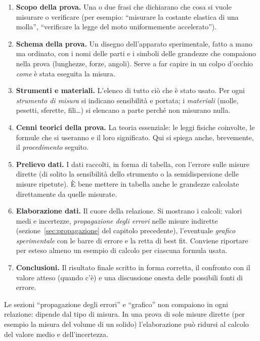 \begin{enumerate}[label=\arabic*.]
    \item \textbf{Scopo della prova.} Una o due frasi che dichiarano che cosa si vuole misurare o verificare (per esempio: ``misurare la costante elastica di una molla'', ``verificare la legge del moto uniformemente accelerato'').
    \item \textbf{Schema della prova.} Un disegno dell'apparato sperimentale, fatto a mano ma ordinato, con i nomi delle parti e i simboli delle grandezze che compaiono nella prova (lunghezze, forze, angoli). Serve a far capire in un colpo d'occhio \emph{come} è stata eseguita la misura.
    \item \textbf{Strumenti e materiali.} L'elenco di tutto ciò che è stato usato. Per ogni \emph{strumento di misura} si indicano sensibilità e portata; i \emph{materiali} (molle, pesetti, sferette, fili\dots) si elencano a parte perché non misurano nulla.
    \item \textbf{Cenni teorici della prova.} La teoria essenziale: le leggi fisiche coinvolte, le formule che si useranno e il loro significato. Qui si spiega anche, brevemente, il \emph{procedimento} seguito.
    \item \textbf{Prelievo dati.} I dati raccolti, in forma di tabella, con l'errore sulle misure dirette (di solito la sensibilità dello strumento o la semidispersione delle misure ripetute). È bene mettere in tabella anche le grandezze calcolate direttamente da quelle misurate.
    \item \textbf{Elaborazione dati.} Il cuore della relazione. Si mostrano i calcoli: valori medi e incertezze, \emph{propagazione degli errori} nelle misure indirette (sezione~\ref{sec:propagazione} del capitolo precedente), l'eventuale \emph{grafico sperimentale} con le barre di errore e la retta di best fit. Conviene riportare per esteso almeno un esempio di calcolo per ciascuna formula usata.
    \item \textbf{Conclusioni.} Il risultato finale scritto in forma corretta, il confronto con il valore atteso (quando c'è) e una discussione onesta delle possibili fonti di errore.
\end{enumerate}

\begin{remark}
Le sezioni ``propagazione degli errori'' e ``grafico'' non compaiono in ogni relazione: dipende dal tipo di misura. In una prova di sole misure dirette (per esempio la misura del volume di un solido) l'elaborazione può ridursi al calcolo del valore medio e dell'incertezza.
\end{remark}

